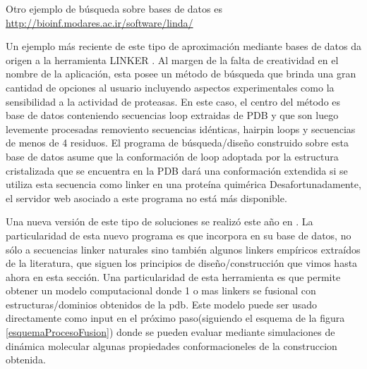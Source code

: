 Otro ejemplo de búsqueda sobre bases de datos es \url{http://bioinf.modares.ac.ir/software/linda/}

Un ejemplo más reciente de este tipo de aproximación mediante bases de datos da origen a la herramienta LINKER \cite{crasto2000linker,xue2004linker}.
Al margen de la falta de creatividad en el nombre de la aplicación, esta posee un método de búsqueda que brinda una gran cantidad de opciones al usuario incluyendo aspectos experimentales como la sensibilidad a la actividad de proteasas.
En este caso, el centro del método es base de datos conteniendo secuencias loop extraidas de PDB y que son luego levemente procesadas removiento secuencias idénticas, hairpin loops y secuencias de menos de 4 residuos. 
El programa de búsqueda/diseño construido sobre esta base de datos asume que la conformación de loop adoptada por la estructura cristalizada que se encuentra en la PDB dará una conformación extendida 
si se utiliza esta secuencia como linker en una proteína quimérica
Desafortunadamente, el servidor web asociado a este programa no está más disponible.



Una nueva versión de este tipo de soluciones se realizó este año en \cite{liu2015synlinker}. 
La particularidad de esta nuevo programa es que incorpora en su base de datos, no sólo a secuencias linker naturales sino también algunos linkers empíricos extraídos de la literatura, 
que siguen los principios de diseño/construcción que vimos hasta ahora en esta sección.
Una particularidad de esta herramienta es que permite obtener un modelo computacional donde 1 o mas linkers se fusional con estructuras/dominios obtenidos de la pdb. 
Este modelo puede ser usado directamente como input en el próximo paso(siguiendo el esquema de la figura \ref{esquemaProcesoFusion}) donde se pueden evaluar mediante simulaciones de dinámica molecular algunas propiedades conformacioneles de la construccion obtenida.




